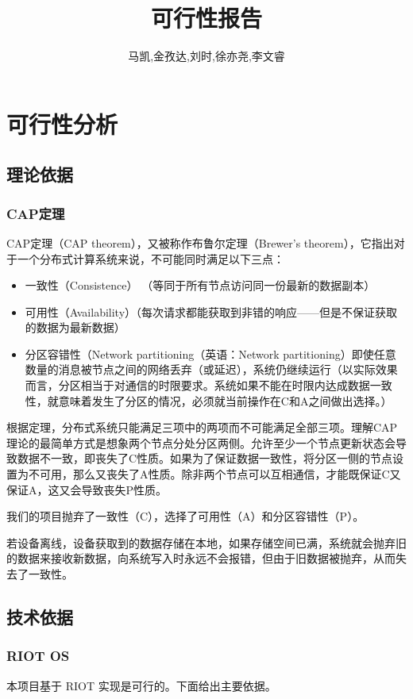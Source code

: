 \documentclass{ctexart}
\begin{document}
\title{可行性报告}
\author{马凯,金孜达,刘时,徐亦尧,李文睿}
\setcounter{tocdepth}{2}
\maketitle
\tableofcontents
\newpage

\section{可行性分析}
\subsection{理论依据}
\subsubsection{CAP定理}
CAP定理（CAP theorem），又被称作布鲁尔定理（Brewer's theorem），它指出对于一个分布式计算系统来说，不可能同时满足以下三点：
\begin{itemize}
    \item 一致性（Consistence） （等同于所有节点访问同一份最新的数据副本）
    \item 可用性（Availability）（每次请求都能获取到非错的响应——但是不保证获取的数据为最新数据）
    \item 分区容错性（Network partitioning（英语：Network partitioning）即使任意数量的消息被节点之间的网络丢弃（或延迟），系统仍继续运行（以实际效果而言，分区相当于对通信的时限要求。系统如果不能在时限内达成数据一致性，就意味着发生了分区的情况，必须就当前操作在C和A之间做出选择。）
\end{itemize}

根据定理，分布式系统只能满足三项中的两项而不可能满足全部三项。理解CAP理论的最简单方式是想象两个节点分处分区两侧。允许至少一个节点更新状态会导致数据不一致，即丧失了C性质。如果为了保证数据一致性，将分区一侧的节点设置为不可用，那么又丧失了A性质。除非两个节点可以互相通信，才能既保证C又保证A，这又会导致丧失P性质。

我们的项目抛弃了一致性（C），选择了可用性（A）和分区容错性（P）。

若设备离线，设备获取到的数据存储在本地，如果存储空间已满，系统就会抛弃旧的数据来接收新数据，向系统写入时永远不会报错，但由于旧数据被抛弃，从而失去了一致性。
\subsection{技术依据}
\subsubsection{RIOT OS}
本项目基于 RIOT 实现是可行的。下面给出主要依据。
\end{document}
